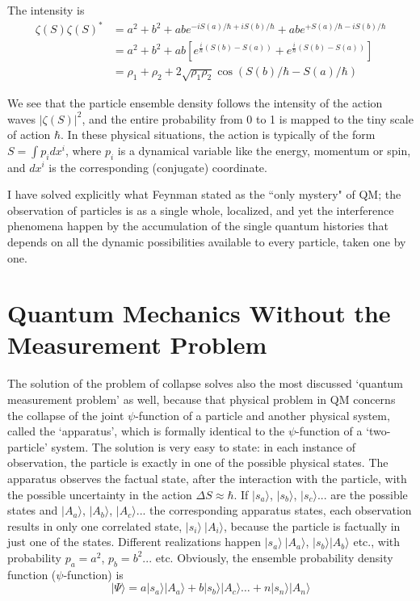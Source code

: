 The intensity is
\begin{align*}
\zeta (S) \zeta (S)^{\ast} & = a^2 + b^2 + abe^{-iS (a) /\hbar + iS (b)/\hbar} + abe^{+ S (a)/\hbar - iS (b)/\hbar}  \\
& = a^2 + b^2 + ab \left[e^{\frac{i}{\hbar} (S(b) - S(a))} + e^{\frac{i}{\hbar}(S(b) - S (a))} \right] \tag{30}\label{c14-eq30}\\
& = \rho_1 + \rho_2 + 2 \sqrt{\rho_1 \rho_2} \cos  (S (b) / \hbar - S (a) / \hbar) \tag{31}\label{c14-eq31}
\end{align*}

We see that the particle ensemble density follows the intensity of the action waves $|\zeta(S)|^2$,
and the entire probability from 0 to 1 is mapped to the tiny scale of action $\hbar$. In these physical
situations, the action is typically of the form $S = \int p_i dx^i$, where $p_i$ is a dynamical variable
like the energy, momentum or spin, and $dx^i$ is the corresponding (conjugate) coordinate.

I have solved explicitly what Feynman stated as the ``only mystery" of QM; the observation of
 particles is as a single whole, localized, and yet the interference phenomena happen
by the accumulation of the single quantum histories that depends on all the dynamic possibilities available to every particle, taken one by one.

\section{Quantum Mechanics Without the\\ Measurement Problem}\label{c14-sec6}

The solution of the problem of collapse solves also the most discussed `quantum measurement problem' \cite{chap14-key8} as well, because that physical problem in QM concerns the collapse of the joint $\psi$-function of a particle and another physical system, called the `apparatus', which is
formally identical to the $\psi$-function of a `two-particle' system. The solution is very easy to
state: in each instance of observation, the particle is exactly in one of the possible physical
states. The apparatus observes the factual state, after the interaction with the particle,
with the possible uncertainty in the action $\Delta S \approx \hbar$. If $|s_a  \rangle$, $|s_b\rangle$, $|s_c\rangle...$ are the possible
states and $|A_a \rangle$, $|A_b \rangle$, $|A_c \rangle ...$ the corresponding apparatus states, each observation results in
only one correlated state, $|s_i \rangle ~|A_i \rangle$, because the particle is factually in just one of the states.
Different realizations happen $|s_a \rangle ~ |A_a  \rangle$, $|s_b  \rangle | A_b \rangle$ etc., with probability $p_a = a^2$, $p_b = b^2 ...$ etc.
Obviously, the ensemble probability density function ($\psi$-function) is
\begin{equation*}
|\Psi \rangle = a | s_a \rangle | A_a \rangle + b |s_b \rangle | A_c \rangle \ldots + n | s_n \rangle | A_n \rangle \tag{32}\label{c14-eq32}
\end{equation*}

